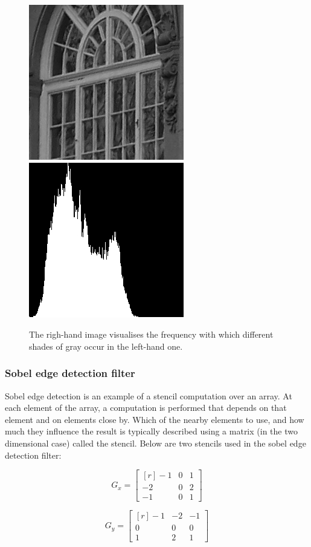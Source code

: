 
\begin{figure} 
\includegraphics[width=.5\linewidth]{./embarbb/img/window}
\includegraphics[width=.5\linewidth]{./embarbb/img/histogram}
\caption{ The righ-hand image visualises the frequency with which 
          different shades of gray occur in the left-hand one.}
\label{fig:histogram}
\end{figure} 

\FloatBarrier
\subsubsection{Sobel edge detection filter}
\label{sec:Sobel}
\FloatBarrier 

Sobel edge detection is an example of a stencil computation
over an array. At each element of the array, a computation is 
performed that depends on that element and on elements close by. Which of the nearby 
elements to use, and how much they influence the result is typically described using a matrix 
(in the two dimensional case) called the stencil. Below are two stencils used in the 
sobel edge detection filter: 

\begin{minipage}{0.5\linewidth}
\[
G_x = \begin{bmatrix*}[r]
        -1 & 0 & 1 \\ 
        -2 & 0 & 2 \\
        -1 & 0 & 1 
      \end{bmatrix*}
\]
\end{minipage}
\begin{minipage}{0.5\linewidth}\centering
\[
G_y = \begin{bmatrix*}[r]
        -1 & -2 & -1 \\ 
         0 &  0 &  0 \\
         1 &  2 &  1 
      \end{bmatrix*}
\]
\end{minipage}

